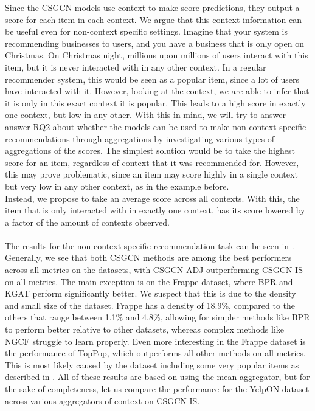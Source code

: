 Since the CSGCN models use context to make score predictions, they output a score for each item in each context.
We argue that this context information can be useful even for non-context specific settings.
Imagine that your system is recommending businesses to users, and you have a business that is only open on Christmas.
On Christmas night, millions upon millions of users interact with this item, but it is never interacted with in any other context.
In a regular recommender system, this would be seen as a popular item, since a lot of users have interacted with it.
However, looking at the context, we are able to infer that it is only in this exact context it is popular.
This leads to a high score in exactly one context, but low in any other.
With this in mind, we will try to answer answer RQ2 about whether the models can be used to make non-context specific recommendations through aggregations by investigating various types of aggregations of the scores.
The simplest solution would be to take the highest score for an item, regardless of context that it was recommended for.
However, this may prove problematic, since an item may score highly in a single context but very low in any other context, as in the example before.\\
Instead, we propose to take an average score across all contexts.
With this, the item that is only interacted with in exactly one context, has its score lowered by a factor of the amount of contexts observed.
\\\\
The results for the non-context specific recommendation task can be seen in .
Generally, we see that both CSGCN methods are among the best performers across all metrics on the datasets, with CSGCN-ADJ outperforming CSGCN-IS on all metrics.
The main exception is on the Frappe dataset, where BPR and KGAT perform significantly better.
We suspect that this is due to the density and small size of the dataset.
Frappe has a density of 18.9\%, compared to the others that range between 1.1\% and 4.8\%, allowing for simpler methods like BPR to perform better relative to other datasets, whereas complex methods like NGCF struggle to learn properly.
Even more interesting in the Frappe dataset is the performance of TopPop, which outperforms all other methods on all metrics.
This is most likely caused by the dataset including some very popular items as described in .
All of these results are based on using the mean aggregator, but for the sake of completeness, let us compare the performance for the YelpON dataset across various aggregators of context on CSGCN-IS.
